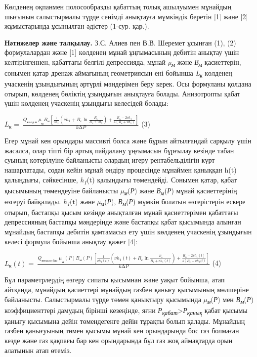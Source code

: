 Көлденең оқпанмен полосообразды қабаттың толық ашылуымен мұнайдың
шығынын салыстырмалы түрде сенімді анықтауға мүмкіндік беретін {[}1{]}
және {[}2{]} жұмыстарында ұсынылған әдістер (1-сур. қар.).

{\bfseries Нәтижелер және талқылау.} З.С. Алиев пен В.В. Шеремет ұсынған
(1), (2) формулалардан және {[}1{]} көлденең мұнай ұңғымасының дебитін
анықтау үшін келтірілгеннен, қабаттағы белгілі депрессияда, мұнай
\emph{µ\textsubscript{м}} және \emph{В\textsubscript{м}} қасиеттерін,
сонымен қатар дренаж аймағының геометриясын ені бойынша
\emph{L\textsubscript{к}} көлденең учаскенің ұзындығының әртүрлі
мәндерімен беру керек. Осы формуланы қолдана отырып, көлденең бөліктің
ұзындығын анықтауға болады. Анизотропты қабат үшін көлденең учаскенің
ұзындығы келесідей болады:

\(L_{к} = \ \frac{{Q_{көлд.м}\ \mu}_{м}B_{м}\left\lbrack \frac{1}{vh_{1}}\left( \nu h_{1} + R_{с}\ln\frac{R_{с}}{R_{с} + vh_{1}} \right) + \frac{R_{к} - 2vh_{1}}{4\left( R_{с} + vh_{1} \right)} \right\rbrack}{k\mathrm{\Delta}P}\)
(3)

Егер мұнай кен орындары массивті болса және бұрын айтылғандай сарқылу
үшін жасалса, олар тіпті бір артық пайдалану ұңғымасын бұрғылау кезінде
табан суының көтерілуіне байланысты олардың игеру рентабельділігін күрт
нашарлатады, содан кейін мұнай өндіру процесінде мұнаймен қаныққан h(t)
қалыңдығы, сәйкесінше, \emph{h\textsubscript{1}}(t) қалыңдығы
төмендейді. Сонымен қатар, қабат қысымының төмендеуіне байланысты
\emph{µ\textsubscript{м}}(\emph{Р}) және
\emph{В\textsubscript{м}}(\emph{Р}) мұнай қасиеттерінің өзгеруі
байқалады. \emph{h\textsubscript{1}}(t) және
\emph{µ\textsubscript{м}}(\emph{Р}), \emph{В\textsubscript{м}}(\emph{Р})
мүмкін болатын өзгерістерін ескере отырып, бастапқы қысым кезінде
анықталған мұнай қасиеттерімен қабаттағы депрессияның бастапқы
мәндерінде және бастапқы қабат қысымында алынған мұнайдың бастапқы
дебитін қамтамасыз ету үшін көлденең учаскенің ұзындығын келесі формула
бойынша анықтау қажет {[}4{]}:

\(L_{к}(t) = \ \frac{{Q_{көлд.м.бас}\ \mu}_{м}(P)B_{м}(P)\left\lbrack \frac{1}{vh_{1}(t)}\left( \nu h_{1}(t) + R_{с}\ln\frac{R_{с}}{R_{с} + vh_{1}(t)} \right) + \frac{R_{к} - 2vh_{1}(t)}{4\left( R_{с} + vh_{1}(t \right)} \right\rbrack}{k\mathrm{\Delta}P}\)
(4)

Бұл параметрлердің өзгеру сипаты қысымнан және уақыт бойынша, атап
айтқанда, мұнайдың қасиеттері мұнайдың газбен қанығу қысымының мөлшеріне
байланысты. Салыстырмалы түрде төмен қанықтыру қысымында
\emph{µ\textsubscript{м}}(\emph{Р}) мен
\emph{В\textsubscript{м}}(\emph{Р}) коэффициенттері дамудың бірінші
кезеңінде, яғни
\emph{Р\textsubscript{қабат}}\textgreater{}\emph{Р\textsubscript{қанық}}
қабат қысымы қанығу қысымына дейін төмендегенге дейін тұрақты болып
қалады. Мұнайдың газбен қанығуының төмен қысымы мұнай кен орындарында
бос газ болмаған кезде және газ қақпағы бар кен орындарында бұл газ жоқ
аймақтарда орын алатынын атап өтеміз.

